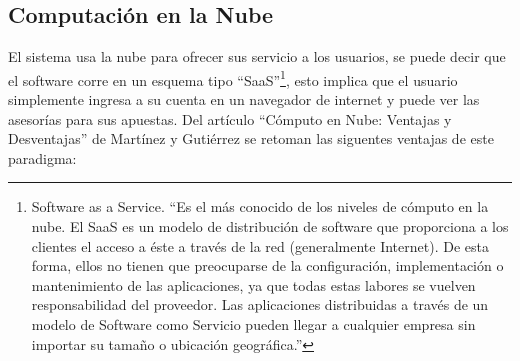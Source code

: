 \subsection{Computación en la Nube}

El sistema usa la nube para ofrecer sus servicio a los usuarios, se puede decir que el software corre en un esquema tipo ``SaaS''\footnote{Software as a Service. ``Es el más conocido de los niveles de cómputo en la nube. El SaaS es un modelo de distribución de software que proporciona a los clientes el acceso a éste a través de la red (generalmente Internet). De esta forma, ellos no tienen que preocuparse de la configuración, implementación o mantenimiento de las aplicaciones, ya que todas estas labores se vuelven responsabilidad del proveedor. Las aplicaciones distribuidas a través de un modelo de Software como Servicio pueden llegar a cualquier empresa sin importar su tamaño o ubicación geográfica.''\cite{computoNube}}, esto implica que el usuario simplemente ingresa a su cuenta en un navegador de internet y puede ver las asesorías para sus apuestas.  
Del artículo ``Cómputo en Nube: Ventajas y Desventajas'' de Martínez y Gutiérrez\cite{computoNube}  se retoman las siguentes ventajas de este paradigma:

